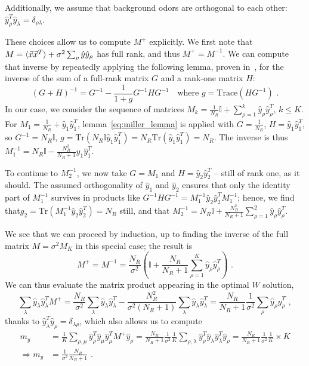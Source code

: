 \documentclass[letter, 12pt]{article}
\def\beq{ \begin{equation} }		%
\def\eeq{ \end{equation} } 			%
\begin{document}
Additionally, we assume that background odors are orthogonal to each other: $\hat{y}_{\rho}^T \hat{y}_{\lambda} = \delta_{\rho \lambda}$. 

These choices allow us to compute $M^+$ explicitly. We first note that $M = \braket{\vec{x} \vec{x}^T} + \sigma^2 \sum_{\rho} \hat{y} \hat{y}_{\rho}$ has full rank, and thus $M^+ = M^{-1}$. We can compute that inverse by repeatedly applying the following lemma, proven in~\cite{miller_inverse_1981}, for the inverse of the sum of a full-rank matrix $G$ and a rank-one matrix $H$:
\beq
	(G + H)^{-1} = G^{-1} - \frac{1}{1 + g} G^{-1} H G^{-1} \quad \text{where} \,\,  g = \mathrm{Trace}(H G^{-1}) \,\, .
	\label{eq:miller_lemma}
\eeq
In our case, we consider the sequence of matrices $M_k = \frac{1}{N_R} \mathbb{I} + \sum_{\rho=1}^k \hat{y}_{\rho} \hat{y}_{\rho}^T$, $k \leq K$. For $M_1 = \frac{1}{N_R} + \hat{y}_1 \hat{y}_1^T$, lemma~\eqref{eq:miller_lemma} is applied with $G = \frac{1}{N_R}$, $H = \hat{y}_1 \hat{y}_1^T$, so $G^{-1} = N_R \mathbb{I}$, $g = \mathrm{Tr}( N_R \mathbb{I} \hat{y}_1 \hat{y}_1^T) = N_R \mathrm{Tr}(\hat{y}_1 \hat{y}_1^T) = N_R$. The inverse is thus $M_1^{-1} = N_R \mathbb{I} - \frac{N_R^2}{N_R + 1} \hat{y}_1 \hat{y}_1^T$. 

To continue to $M_2^{-1}$, we now take $G = M_1$ and $H = \hat{y}_2 \hat{y}_2^T$ -- still of rank one, as it should. The assumed orthogonality of $\hat{y}_1$ and $\hat{y}_2$ ensures that only the identity part of $M_1^{-1}$ survives in products like $G^{-1} H G^{-1} = M_1^{-1} \hat{y}_2 \hat{y}_2^T M_1^{-1}$; hence, we find that$g_2 = \mathrm{Tr}(M_1^{-1} \hat{y}_2 \hat{y}_2^T) = N_R$ still, and that $M_2^{-1} = N_R \mathbb{I} + \frac{N_R^2}{N_R + 1} \sum_{\rho=1}^2 \hat{y}_{\rho} \hat{y}_{\rho}^T$. 

We see that we can proceed by induction, up to finding the inverse of the full matrix $M = \sigma^2 M_K$ in this special case; the result is
\beq
	M^+ = M^{-1} = \frac{N_R}{\sigma^2} \left( \mathbb{I} + \frac{N_R}{N_R + 1} \sum_{\rho=1}^K \hat{y}_{\rho} \hat{y}_{\rho}^T  \right)\,\, .
\label{eq:m_inverse}
\eeq
We can thus evaluate the matrix product appearing in the optimal $W$ solution, 
\begin{equation*}
	\sum_{\lambda} \hat{y}_{\lambda} \hat{y}_{\lambda}^T M^+ = \frac{N_R}{\sigma^2} \sum_{\lambda} \hat{y}_{\lambda} \hat{y}_{\lambda}^T - \frac{N_R^2}{\sigma^2 (N_R + 1)} \sum_{\lambda} \hat{y}_{\lambda} \hat{y}_{\lambda}^T =  \frac{N_R}{N_R + 1} \frac{1}{\sigma^2} \sum_{\rho} \hat{y}_{\rho} \hat{y}_{\rho}^T  \, \, ,
\end{equation*}
thanks to  $\hat{y}_{\lambda}^T \hat{y}_{\rho} = \delta_{\lambda \rho}$, which also allows us to compute
\begin{align*}
	m_y &= \frac1K \sum_{\rho, \mu} \hat{y}_{\rho}^T \hat{y}_{\mu} \hat{y}_{\mu}^T M^+ \hat{y}_{\rho} = \frac{N_R}{N_R + 1} \frac{1}{\sigma^2}  \frac1K  \sum_{\rho, \lambda} \hat{y}_{\rho}^T \hat{y}_{\lambda} \hat{y}_{\lambda}^T \hat{y}_{\rho} =  \frac{N_R}{N_R + 1} \frac{1}{\sigma^2}  \frac1K \times K \\
	\Rightarrow m_y &=   \frac{1}{\sigma^2} \frac{N_R}{N_R + 1} \,\, .
\end{align*}
\end{document}
